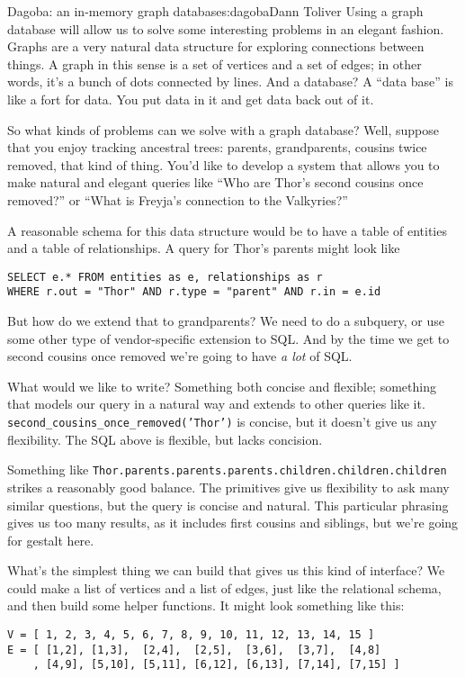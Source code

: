 \begin{aosachapter}{Dagoba: an in-memory graph database}{s:dagoba}{Dann Toliver}
Using a graph database will allow us to solve some interesting problems
in an elegant fashion. Graphs are a very natural data structure for
exploring connections between things. A graph in this sense is a set of
vertices and a set of edges; in other words, it's a bunch of dots
connected by lines. And a database? A ``data base'' is like a fort for
data. You put data in it and get data back out of it.

So what kinds of problems can we solve with a graph database? Well,
suppose that you enjoy tracking ancestral trees: parents, grandparents,
cousins twice removed, that kind of thing. You'd like to develop a
system that allows you to make natural and elegant queries like ``Who
are Thor's second cousins once removed?'' or ``What is Freyja's
connection to the Valkyries?''

A reasonable schema for this data structure would be to have a table of
entities and a table of relationships. A query for Thor's parents might
look like

\begin{verbatim}
SELECT e.* FROM entities as e, relationships as r
WHERE r.out = "Thor" AND r.type = "parent" AND r.in = e.id
\end{verbatim}

But how do we extend that to grandparents? We need to do a subquery, or
use some other type of vendor-specific extension to SQL. And by the time
we get to second cousins once removed we're going to have \emph{a lot}
of SQL.

What would we like to write? Something both concise and flexible;
something that models our query in a natural way and extends to other
queries like it. \texttt{second\_cousins\_once\_removed('Thor')} is
concise, but it doesn't give us any flexibility. The SQL above is
flexible, but lacks concision.

Something like
\texttt{Thor.parents.parents.parents.children.children.children} strikes
a reasonably good balance. The primitives give us flexibility to ask
many similar questions, but the query is concise and natural. This
particular phrasing gives us too many results, as it includes first
cousins and siblings, but we're going for gestalt here.

What's the simplest thing we can build that gives us this kind of
interface? We could make a list of vertices and a list of edges, just
like the relational schema, and then build some helper functions. It
might look something like this:

\begin{verbatim}
V = [ 1, 2, 3, 4, 5, 6, 7, 8, 9, 10, 11, 12, 13, 14, 15 ]
E = [ [1,2], [1,3],  [2,4],  [2,5],  [3,6],  [3,7],  [4,8]
    , [4,9], [5,10], [5,11], [6,12], [6,13], [7,14], [7,15] ]


\end{verbatim}
\end{aosachapter}

